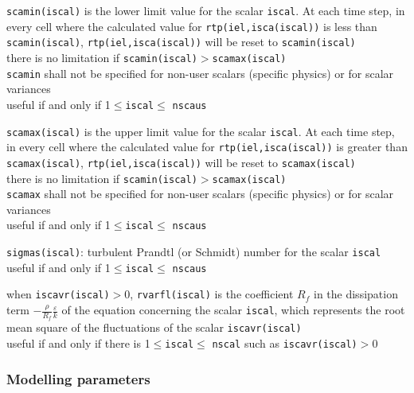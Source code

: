 {{\tt scamin(iscal)} is the lower limit value for the scalar {\tt iscal}. At each time step,
in every cell where the calculated value for {\tt rtp(iel,isca(iscal))} is less than
\mbox{\tt scamin(iscal)}, {\tt rtp(iel,isca(iscal))} will be reset to
\mbox{\tt scamin(iscal)}\\
there is no limitation if {\tt scamin(iscal)}$>${\tt scamax(iscal)}\\
{\tt scamin} shall not be specified for non-user scalars (specific physics) or for
scalar variances\\
useful if and only if 1$\leqslant${\tt iscal}$\leqslant$ {\tt nscaus}}

{{\tt scamax(iscal)} is the upper limit value for the scalar {\tt iscal}. At each time step,
in every cell where the calculated value for {\tt rtp(iel,isca(iscal))} is greater than
\mbox{\tt scamax(iscal)}, {\tt rtp(iel,isca(iscal))} will be reset to
\mbox{\tt scamax(iscal)}\\
there is no limitation if {\tt scamin(iscal)}$>${\tt scamax(iscal)}\\
{\tt scamax} shall not be specified for non-user scalars (specific physics)
 or for scalar variances\\
useful if and only if 1$\leqslant${\tt iscal}$\leqslant$ {\tt nscaus}}

{{\tt sigmas(iscal)}: turbulent Prandtl (or Schmidt) number for the scalar
 {\tt iscal}\\
useful if and only if  1$\leqslant${\tt iscal}$\leqslant$ {\tt nscaus}}

{when {\tt iscavr(iscal)}$>$0, {\tt rvarfl(iscal)} is the coefficient $R_f$ in
the dissipation term $\displaystyle -\frac{\rho}{R_f}\frac{\varepsilon}{k}$
of the equation concerning the scalar {\tt iscal},
which represents the root mean square of the
fluctuations of the scalar {\tt iscavr(iscal)}\\
useful if and only if there is 1$\leqslant${\tt iscal}$\leqslant$ {\tt nscal} such as
 {\tt iscavr(iscal)}$>$0}


\subsubsection{Modelling parameters}


